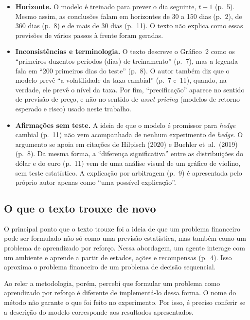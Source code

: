 \begin{itemize}
  \item \textbf{Horizonte.}
  O modelo é treinado para prever o dia seguinte, $t+1$ (p.~5). Mesmo assim, as conclusões falam em horizontes de 30 a 150 dias (p.~2), de 360 dias (p.~8) e de mais de 30 dias (p.~11). O texto não explica como essas previsões de vários passos à frente foram geradas.
  
  \item \textbf{Inconsistências e terminologia.}
  O texto descreve o Gráfico~2 como os ``primeiros duzentos períodos (dias) de treinamento'' (p.~7), mas a legenda fala em ``200 primeiros dias do teste'' (p.~8). O autor também diz que o modelo prevê ``a volatilidade da taxa cambial'' (p.~7 e~11), quando, na verdade, ele prevê o nível da  taxa. Por fim, ``precificação'' aparece no sentido de previsão de preço, e não no sentido de \emph{asset pricing} (modelos de retorno esperado e risco) usado neste trabalho.
  
  \item \textbf{Afirmações sem teste.} 
  A ideia de que o modelo é promissor para \emph{hedge} cambial (p.~11) não vem acompanhada de nenhum experimento de \emph{hedge}. O argumento se apoia em citações de Hilpisch (2020) e Buehler et~al.~(2019) (p.~8). Da mesma forma, a ``diferença significativa'' entre as distribuições do dólar e do euro (p.~11) vem de uma análise visual de um gráfico de violino, sem teste estatístico. A explicação por arbitragem (p.~9) é apresentada pelo próprio autor apenas como ``uma possível explicação''.
\end{itemize}

\subsection*{O que o texto trouxe de novo}

O principal ponto que o texto trouxe foi a ideia de que um problema financeiro pode ser formulado não só como uma previsão estatística, mas também como um problema de aprendizado por reforço. Nessa abordagem, um agente interage com um ambiente e aprende a partir de estados, ações e recompensas (p.~4). Isso aproxima o problema financeiro de um problema de decisão sequencial.

Ao reler a metodologia, porém, percebi que formular um problema como aprendizado por reforço é diferente de implementá-lo dessa forma. O nome do método não garante o que foi feito no experimento. Por isso, é preciso conferir se a descrição do modelo corresponde aos resultados apresentados.

